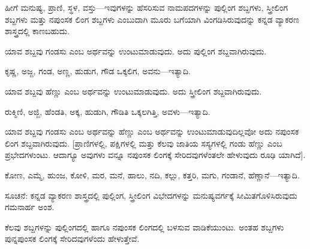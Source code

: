 \indent ಹೀಗೆ ಮನುಷ್ಯ, ಪ್ರಾಣಿ, ಸ್ಥಳ, ವಸ್ತು—ಇವುಗಳನ್ನು ಹೆಸರಿಸುವ ನಾಮಪದಗಳನ್ನು ಪುಲ್ಲಿಂಗ ಶಬ್ದಗಳು, ಸ್ತ್ರೀಲಿಂಗ ಶಬ್ದಗಳು ಮತ್ತು ನಪುಂಸಕ ಲಿಂಗ ಶಬ್ದಗಳು ಎಂಬುದಾಗಿ ಮೂರು ಬಗೆಯಾಗಿ ವಿಂಗಡಿಸಿರುವುದನ್ನು ಕನ್ನಡ ವ್ಯಾಕರಣ ಶಾಸ್ತ್ರದಲ್ಲಿ ಕಾಣಬಹುದು.\par

\vspace{2.5pt plus 3pt minus 0.5pt}\noindent\hspace*{1.2em}\hspace{0.55em}ಯಾವ ಶಬ್ದವು ಗಂಡಸು ಎಂಬ ಅರ್ಥವನ್ನು ಉಂಟುಮಾಡುವುದು. ಅದು ಪುಲ್ಲಿಂಗ ಶಬ್ದವಾಗಿರುವುದು.\par

\noindent\hspace*{1.2em}\hspace{0.6em}ಕೃಷ್ಣ, ಅಜ್ಜ, ಗಂಡ, ಅಣ್ಣ, ಹುಡುಗ, ಗೌಡ ಒಕ್ಕಲಿಗ, ಅವನು—ಇತ್ಯಾದಿ.\par

\vspace{2.5pt plus 3pt minus 0.5pt}\noindent\hspace*{1.2em}\hspace{0.55em}ಯಾವ ಶಬ್ದವು ಹೆಣ್ಣು ಎಂಬ ಅರ್ಥವನ್ನು ಉಂಟುಮಾಡುವುದು. ಅದು ಸ್ತ್ರೀಲಿಂಗ ಶಬ್ದವಾಗಿರುವುದು.\par

\noindent\hspace*{1.2em}\hspace{0.6em}ರುಕ್ಮಿಣಿ, ಅಜ್ಜಿ, ಹೆಂಡತಿ, ಅಕ್ಕ, ಹುಡುಗಿ, ಗೌಡಿತಿ ಒಕ್ಕಲಗಿತ್ತಿ, ಅವಳು—ಇತ್ಯಾದಿ.\par

\vspace{2.5pt plus 3pt minus 0.5pt}\noindent\hspace*{1.2em}\hspace{0.55em}ಯಾವ ಶಬ್ದವು ಗಂಡಸು ಎಂಬ ಅರ್ಥವನ್ನು ಹೆಣ್ಣು ಎಂಬ ಅರ್ಥವನ್ನು ಉಂಟುಮಾಡುವುದಿಲ್ಲವೋ ಅದು ನಪುಂಸಕ ಲಿಂಗ ಶಬ್ದವಾಗಿರುವುದು. {[}ಪ್ರಾಣಿಗಳಲ್ಲಿ, ಪಕ್ಷಿಗಳಲ್ಲಿ ಮತ್ತು ಕೆಲವು ಜಾತಿಯ ಸಸ್ಯಗಳಲ್ಲಿ ಗಂಡು ಹೆಣ್ಣು ಎಂಬ ಪ್ರಭೇದಗಳುಂಟು. ಆದಾಗ್ಯೂ ಅವುಗಳು ವನ್ನೂ ನಪುಂಸಕ ಲಿಂಗಕ್ಕೆ ಸೇರಿದವುಗಳೆಂತಲೇ ಹೇಳುವುದು ರೂಢಿ ಯಾಗಿದೆ{]}.\par

\noindent\hspace*{1.2em}\hspace{0.6em}ಕೋಣ, ಎಮ್ಮೆ, ಹುಂಜ, ಕೋಳಿ, ಮರ, ಮನೆ, ಹಾಲು, ನದಿ, ಕಲ್ಲು, ಕತ್ತರಿ, ಮಗು, ಗಂಡಾನೆ, ಹೆಣ್ಣಾನೆ—ಇತ್ಯಾದಿ.\par

\indent ಸೂಚನೆ: ಕನ್ನಡ ವ್ಯಾಕರಣ ಶಾಸ್ತ್ರದಲ್ಲಿ ಪುಲ್ಲಿಂಗ, ಸ್ತ್ರೀಲಿಂಗ ವಿಭೇದಗಳನ್ನು ಮನುಷ್ಯವರ್ಗಕ್ಕೆ ಸೀಮಿತಗೊಳಿಸಿರುವುದು ಗಮನಾರ್ಹ ಅಂಶ.\par


\begin{kbvrule}
\noindent\kbvbullet\hspace{0.5em}ಕೆಲವು ಶಬ್ದಗಳನ್ನು ಪುಲ್ಲಿಂಗದಲ್ಲಿ ಹಾಗೂ ನಪುಂಸಕ ಲಿಂಗದಲ್ಲಿ ಬಳಸುವ ವಾಡಿಕೆಯುಂಟು. ಅಂತಹ ಶಬ್ದಗಳು ಪುನ್ನಪುಂಸಕ ಲಿಂಗಕ್ಕೆ ಸೇರಿದವುಗಳೆಂದು ಹೇಳುತ್ತೇವೆ.
\end{kbvrule}
